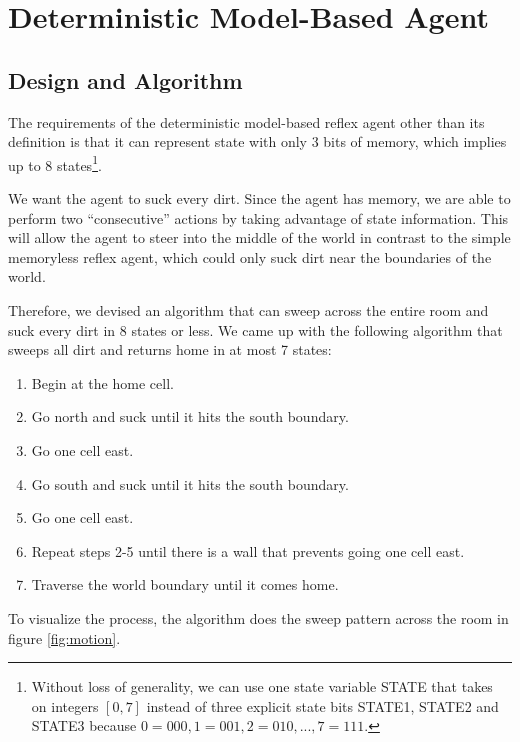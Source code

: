 \section{Deterministic Model-Based Agent}

\subsection{Design and Algorithm}

The requirements of the deterministic model-based reflex agent other than its definition is that it can represent state with only 3 bits of memory, which implies up to 8 states\footnote{Without loss of generality, we can use one state variable STATE that takes on integers $[0, 7]$ instead of three explicit state bits STATE1, STATE2 and STATE3 because $0 = 000, 1 = 001, 2 = 010, ..., 7 = 111$.}.

We want the agent to suck every dirt. Since the agent has memory, we are able to perform two ``consecutive'' actions by taking advantage of state information. This will allow the agent to steer into the middle of the world in contrast to the simple memoryless reflex agent, which could only suck dirt near the boundaries of the world.

Therefore, we devised an algorithm that can sweep across the entire room and suck every dirt in 8 states or less. We came up with the following algorithm that sweeps all dirt and returns home in at most 7 states:

\begin{enumerate}
	\item Begin at the home cell.
	\item Go north and suck until it hits the south boundary. 
	\item Go one cell east.
	\item Go south and suck until it hits the south boundary.
	\item Go one cell east.
	\item Repeat steps 2-5 until there is a wall that prevents going one cell east.
	\item Traverse the world boundary until it comes home.
\end{enumerate}

To visualize the process, the algorithm does the sweep pattern across the room in figure \ref{fig:motion}.


